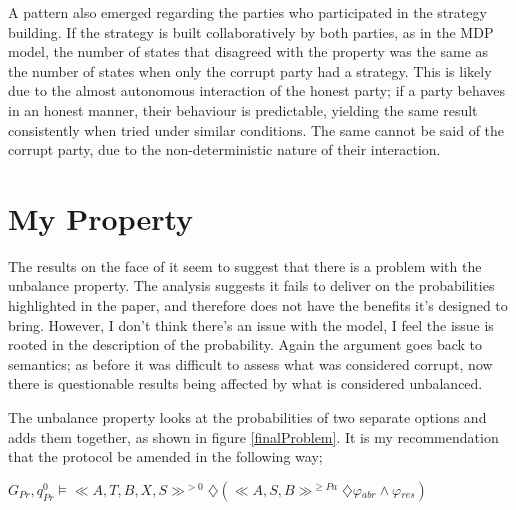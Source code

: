 \documentclass{l4proj}
\begin{document}
A pattern also emerged regarding the parties who participated in the strategy building. If the strategy is built collaboratively by both parties, as in the MDP model, the number of states that disagreed with the property was the same as the number of states when only the corrupt party had a strategy. This is likely due to the almost autonomous interaction of the honest party; if a party behaves in an honest manner, their behaviour is predictable, yielding the same result consistently when tried under similar conditions. The same cannot be said of the corrupt party, due to the non-deterministic nature of their interaction.

\section{My Property}

The results on the face of it seem to suggest that there is a problem with the unbalance property. The analysis suggests it fails to deliver on the probabilities highlighted in the paper, and therefore does not have the benefits it's designed to bring. However, I don't think there's an issue with the model, I feel the issue is rooted in the description of the probability. Again the argument goes back to semantics; as before it was difficult to assess what was considered corrupt, now there is questionable results being affected by what is considered unbalanced. 

The unbalance property looks at the probabilities of two separate options and adds them together, as shown in figure \ref{finalProblem}. It is my recommendation that the protocol be amended in the following way;\\

\centerline{$ G{_{Pr}},q_{Pr}^{0}\models  \ll A, T, B, X, S \gg ^{>0} \diamondsuit (\ll A, S, B \gg^{\ge Pa} \diamondsuit \varphi{_{abr}} \wedge \varphi{_{res}}) $}
\end{document}
